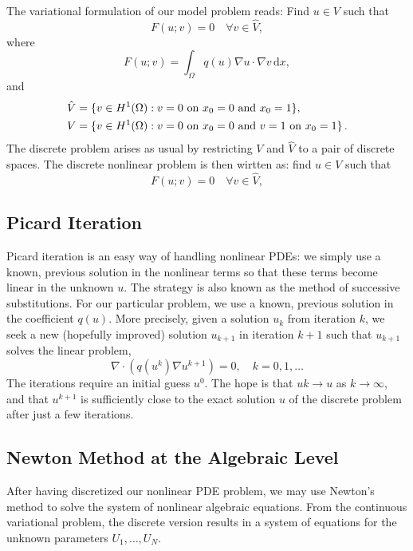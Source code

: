 \noindent The variational formulation of our model problem reads: Find $u\in V$ such that
\begin{equation}
F(u; v) = 0 \quad \forall v \in \hat{V},
\end{equation}
where
\begin{equation}
F(u; v) = \int_\Omega q(u)\nabla u\cdot \nabla v \, \mathrm{d}x,
\end{equation}
and
\begin{eqnarray}
\begin{split}\hat{V} &= \{v \in H^1(\Omega) : v = 0 \mbox{ on } x_0=0\mbox{ and }x_0=1\}, \\
V      &= \{v \in H^1(\Omega) : v = 0 \mbox{ on } x_0=0\mbox{ and } v = 1\mbox{ on }x_0=1\}\thinspace .\end{split}
\end{eqnarray}
The discrete problem arises as usual by restricting $V$ and $\hat{V}$ to a pair of discrete spaces. The discrete nonlinear problem is then wirtten as: find $u\in V$ such that
\begin{equation}
F(u; v) = 0 \quad \forall v \in \hat{V},
\end{equation}

\subsection{Picard Iteration}
Picard iteration is an easy way of handling nonlinear PDEs: we simply use a known, previous solution in the nonlinear terms so that these terms become linear in the unknown $u$. The strategy is also known as the method of successive substitutions. For our particular problem, we use a known, previous solution in the coefficient $q(u)$. More precisely, given a solution $u_k$ from iteration $k$, we seek a new (hopefully improved) solution $u_{k+1}$ in iteration $k+1$ such that $u_{k+1}$ solves the linear problem,
\begin{equation}
\nabla\cdot \left(q(u^k)\nabla u^{k+1}\right) = 0,\quad k=0,1,\ldots
\end{equation}
The iterations require an initial guess $u^0$. The hope is that $uk\rightarrow u$ as $k \rightarrow \infty$, and that $u^{k+1}$ is sufficiently close to the exact solution $u$ of the discrete problem after just a few iterations.

\pagebreak
\subsection{Newton Method at the Algebraic Level}
After having discretized our nonlinear PDE problem, we may use Newton’s method to solve the system of nonlinear algebraic equations. From the continuous variational problem, the discrete version results in a system of equations for the unknown parameters $U_1,…,U_N$.

